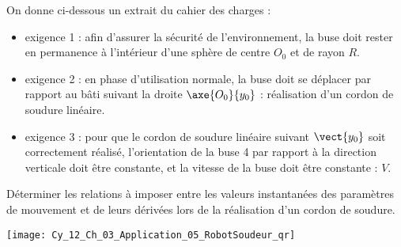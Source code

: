 \noindent On donne ci-dessous un extrait du cahier des charges :
\begin{itemize}
\item exigence 1 : afin d’assurer la sécurité de l’environnement, la buse doit rester en permanence à l’intérieur
d’une sphère de centre $O_0$ et de rayon $R$.
\item exigence 2 : en phase d’utilisation normale, la buse doit se déplacer par rapport au bâti suivant la droite $\axe{O_0}{y_0}$ : réalisation d’un cordon de soudure linéaire.
\item exigence 3 : pour que le cordon de soudure linéaire suivant $\vect{y_0}$ soit correctement réalisé, l’orientation de la
buse 4 par rapport à la direction verticale doit être constante, et la vitesse de la buse doit être 
constante : $V$.
\end{itemize}

\begin{obj}
Déterminer les relations à imposer entre les valeurs instantanées des paramètres de mouvement et
de leurs dérivées lors de la réalisation d’un cordon de soudure.
\end{obj}




\ifprof
\else
\begin{marginfigure}
\centering
\texttt{[image: Cy\_12\_Ch\_03\_Application\_05\_RobotSoudeur\_qr]}
\end{marginfigure}
\fi






